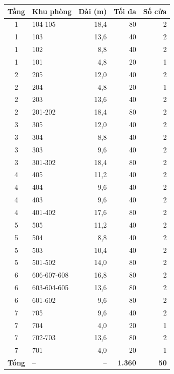 \small\begin{tabular}{clrrr}
\toprule
Tầng & Khu phòng & Dài (m) & Tối đa & Số cửa\\\midrule
1 & 104-105 & 18,4 & 80 & 2\\
1 & 103 & 13,6 & 40 & 2\\
1 & 102 & 8,8 & 40 & 2\\
1 & 101 & 4,8 & 20 & 1\\
2 & 205 & 12,0 & 40 & 2\\
2 & 204 & 4,8 & 20 & 1\\
2 & 203 & 13,6 & 40 & 2\\
2 & 201-202 & 18,4 & 80 & 2\\
3 & 305 & 12,0 & 40 & 2\\
3 & 304 & 8,8 & 40 & 2\\
3 & 303 & 9,6 & 40 & 2\\
3 & 301-302 & 18,4 & 80 & 2\\
4 & 405 & 11,2 & 40 & 2\\
4 & 404 & 9,6 & 40 & 2\\
4 & 403 & 9,6 & 40 & 2\\
4 & 401-402 & 17,6 & 80 & 2\\
5 & 505 & 11,2 & 40 & 2\\
5 & 504 & 8,8 & 40 & 2\\
5 & 503 & 10,4 & 40 & 2\\
5 & 501-502 & 14,0 & 80 & 2\\
6 & 606-607-608 & 16,8 & 80 & 2\\
6 & 603-604-605 & 13,6 & 80 & 2\\
6 & 601-602 & 9,6 & 80 & 2\\
7 & 705 & 9,6 & 40 & 2\\
7 & 704 & 4,0 & 20 & 1\\
7 & 702-703 & 13,6 & 80 & 2\\
7 & 701 & 4,0 & 20 & 1\\
\textbf{Tổng} & -- & -- & \textbf{1.360} & \textbf{50}\\
\bottomrule\end{tabular}
